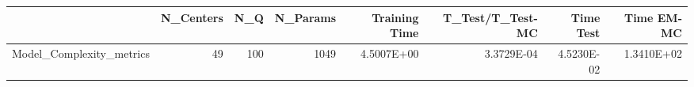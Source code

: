 \begin{tabular}{lrrrrrrr}
\toprule
{} &  N\_Centers &  N\_Q &  N\_Params &  Training Time &  T\_Test/T\_Test-MC &  Time Test &  Time EM-MC \\
\midrule
Model\_Complexity\_metrics &         49 &  100 &      1049 &     4.5007E+00 &        3.3729E-04 & 4.5230E-02 &  1.3410E+02 \\
\bottomrule
\end{tabular}
